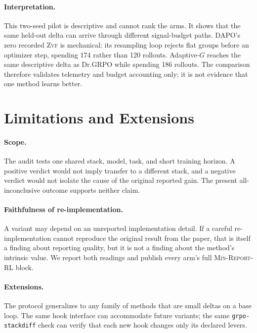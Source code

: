 \documentclass[11pt]{article}
\newcommand{\zvf}{\textsc{Zvf}}
\newcommand{\minreport}{\textsc{Min-Report-RL}}
\newcommand{\grpo}{\textsc{GRPO}}
\begin{document}
\paragraph{Interpretation.} This two-seed pilot is descriptive and cannot rank
the arms. It shows that the same held-out delta can arrive through different
signal-budget paths. DAPO's zero recorded \zvf{} is mechanical: its resampling
loop rejects flat groups before an optimizer step, spending 174 rather than 120
rollouts. Adaptive-$G$ reaches the same descriptive delta as Dr.\grpo{} while
spending 186 rollouts. The comparison therefore validates telemetry and budget
accounting only; it is not evidence that one method learns better.

\section{Limitations and Extensions}

\paragraph{Scope.} The audit tests one shared stack, model, task, and short
training horizon. A positive verdict would not imply transfer to a different
stack, and a negative verdict would not isolate the cause of the original
reported gain. The present all-inconclusive outcome supports neither claim.

\paragraph{Faithfulness of re-implementation.} A variant may depend on an
unreported implementation detail. If a careful re-implementation cannot
reproduce the original result from the paper, that is itself a finding about
reporting quality, but it is not a finding about the method's intrinsic value.
We report both readings and publish every arm's full \minreport{} block.

\paragraph{Extensions.} The protocol generalizes to any family of methods that
are small deltas on a base loop. The same hook interface can accommodate
future variants; the same \texttt{grpo-stackdiff} check can verify that each
new hook changes only its declared levers.
\end{document}
